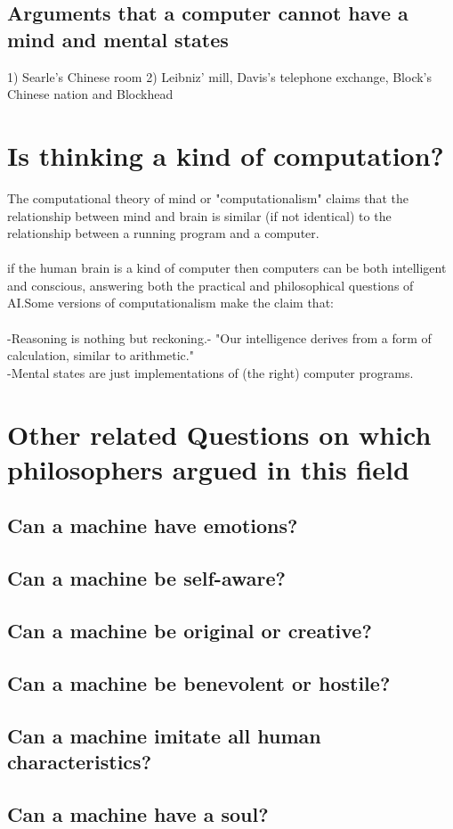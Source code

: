 \documentclass[a4paper]{article}
\begin{document}
\bigskip
\subsection{Arguments that a computer cannot have a mind and mental states}
1) Searle's Chinese room
2) Leibniz' mill, Davis's telephone exchange, Block's Chinese nation and Blockhead
\bigskip

\section{Is thinking a kind of computation?}
The computational theory of mind or "computationalism" claims that the relationship between mind and brain is similar (if not identical) to the relationship between a running program and a computer.\\
\\if the human brain is a kind of computer then computers can be both intelligent and conscious, answering both the practical and philosophical questions of AI.Some versions of computationalism make the claim that:\\
\\
-Reasoning is nothing but reckoning.-  "Our intelligence derives from a form of calculation, similar to arithmetic."\\
-Mental states are just implementations of (the right) computer programs.\\

\bigskip

\section{Other related Questions on which philosophers argued in this field}
\subsection{Can a machine have emotions?}
\subsection{Can a machine be self-aware?}
\subsection{Can a machine be original or creative?}
\subsection{Can a machine be benevolent or hostile?}
\subsection{Can a machine imitate all human characteristics?}
\subsection{Can a machine have a soul?}
\end{document}

